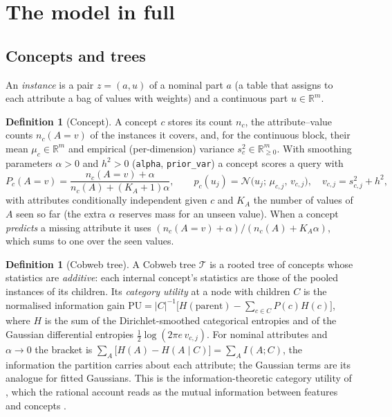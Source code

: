 \documentclass[11pt]{article}
\theoremstyle{definition}
\newtheorem{definition}[theorem]{Definition}
\theoremstyle{remark}
\newcommand{\R}{\mathbb{R}}
\newcommand{\N}{\mathcal{N}}
\newcommand{\T}{\mathcal{T}}
\begin{document}
\appendix
{}

\section{The model in full}\label{app:model}\label{sec:model}

\subsection{Concepts and trees}

An \emph{instance} is a pair $z=(a,u)$ of a nominal part $a$ (a table that assigns to
each attribute a bag of values with weights) and a continuous part $u\in\R^m$.

\begin{definition}[Concept]\label{def:concept}
A concept $c$ stores its count $n_c$, the attribute--value counts $n_c(A{=}v)$ of the
instances it covers, and, for the continuous block, their mean $\mu_c\in\R^m$ and
empirical (per-dimension) variance $s_c^2\in\R^m_{\ge0}$.  With smoothing parameters
$\alpha>0$ and $h^2>0$ (\texttt{alpha}, \texttt{prior\_var}) a concept scores a query
with
\[
  P_c(A{=}v)=\frac{n_c(A{=}v)+\alpha}{n_c(A)+(K_A+1)\alpha},\qquad
  p_c(u_j)=\N\bigl(u_j;\,\mu_{c,j},\,v_{c,j}\bigr),\quad v_{c,j}=s^2_{c,j}+h^2,
\]
with attributes conditionally independent given $c$ and $K_A$ the number of values of $A$
seen so far (the extra $\alpha$ reserves mass for an unseen value).  When a concept
\emph{predicts} a missing attribute it uses $(n_c(A{=}v)+\alpha)/(n_c(A)+K_A\alpha)$,
which sums to one over the seen values.
\end{definition}

\begin{definition}[Cobweb tree]
A Cobweb tree $\T$ is a rooted tree of concepts whose statistics are \emph{additive}:
each internal concept's statistics are those of the pooled instances of its children.
Its \emph{category utility} at a node with children $C$ is the normalised information
gain $\mathrm{PU}=|C|^{-1}\bigl[H(\text{parent})-\sum_{c\in C}P(c)H(c)\bigr]$, where
$H$ is the sum of the Dirichlet-smoothed categorical entropies and of the Gaussian
differential entropies $\tfrac12\log(2\pi e\,v_{c,j})$.  For nominal attributes and
$\alpha\to0$ the bracket is $\sum_A\bigl[H(A)-H(A\mid C)\bigr]=\sum_AI(A;C)$, the
information the partition carries about each attribute; the Gaussian terms are its
analogue for fitted Gaussians.  This is the information-theoretic category utility of
\citet{corter1992}, which the rational account reads as the mutual information between
features and concepts \citep{maclellan2026rational}.
\end{definition}
\end{document}
